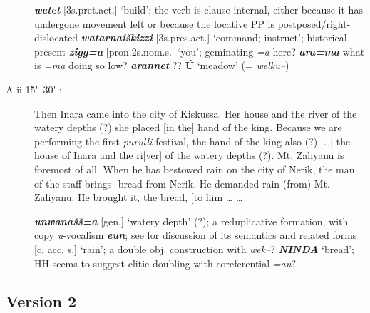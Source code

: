 \documentclass[10pt]{article}
\newcommand{\bit}[1]{\textbf{\textit{#1}}}				%
\newcommand{\p}[1]{{\tiny[{#1}]}}					%
\newcommand{\pr}{\'{ }}									%
\newcommand{\hith}{\textsubwedge{h}}
\renewcommand{\.}[1]{\textsubdot{#1}}
\begin{document}
\begin{description}
\begin{notes}

\bit{wetet} \p{3s.pret.act.} `build'; the verb is clause-internal, either because it has undergone movement left or because the locative PP is postposed/right-dislocated \bit{watarna{\hith}{\hith}i\v{s}kizzi} \p{3s.pres.act.} `command; instruct'; historical present \bit{zigg=a} \p{pron.2s.nom.s.} `you'; geminating \textit{=a} here? \bit{ar{\hith}a=ma} what is \textit{=ma} doing so low? \bit{{\hith}arannet} ?? \textbf{\'U} `meadow' (= \textit{welku--}) 

\end{notes}

\item[A ii 15{\pr}--30{\pr} :] Then Inara came into the city of Kiskussa. Her house and the river of the watery depths (?) she placed [in the] hand of the king. Because we are performing the first \textit{purulli-}festival, the hand of the king also (?) [{\ldots}] the house of Inara and the ri[ver] of the watery depths (?). Mt. Zaliyanu is foremost of all. When he has bestowed rain on the city of Nerik, the man of the staff brings \textit{{\hith}}-bread from Nerik. He demanded rain (from) Mt. Zaliyanu. He brought it, the bread, [to him {\ldots} {\ldots} 

\begin{notes}

\bit{{\hith}un{\hith}wana\v{s}\v{s}=a} \p{gen.} `watery depth' (?); a reduplicative formation, with copy \textit{u}-vocalism \bit{{\hith}eun}; see \citet[21--2]{beckman1982illuyanka} for discussion of its semantics and related forms \p{c. acc. s.} `rain'; a double obj. construction with \textit{wek--}? \bit{NINDA} `bread'; HH seems to suggest clitic doubling with coreferential \textit{=an}?

\end{notes}

\end{description}

\subsection{Version 2}
\end{document}
